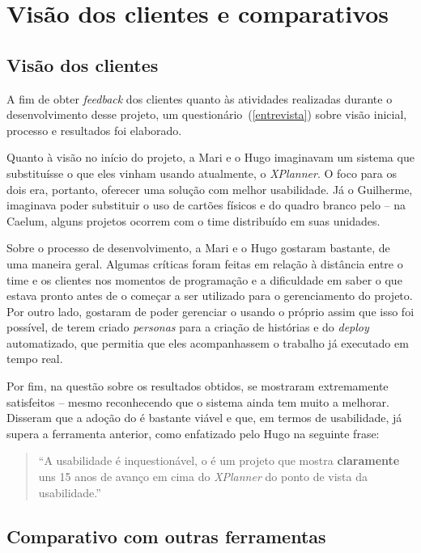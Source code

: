 \section{Visão dos clientes e comparativos}

\subsection{Visão dos clientes}

A fim de obter \textit{feedback} dos clientes quanto às atividades realizadas durante o desenvolvimento desse projeto,
um questionário~(\ref{entrevista}) sobre visão inicial, processo e resultados foi elaborado.

Quanto à visão no início do projeto, a Mari e o Hugo imaginavam um sistema que substituísse o que eles vinham usando atualmente, o \textit{XPlanner}. O foco para os dois era, portanto, oferecer uma solução com melhor usabilidade. Já o Guilherme, imaginava poder substituir o uso de cartões físicos e do quadro branco pelo \calopsita{} -- na Caelum, alguns projetos ocorrem com o time distribuído em suas unidades.

Sobre o processo de desenvolvimento, a Mari e o Hugo gostaram bastante, de uma maneira geral. Algumas críticas foram feitas em relação à distância entre o time e os clientes nos momentos de programação e a dificuldade em saber o que estava pronto antes de o \calopsita{} começar a ser utilizado para o gerenciamento do projeto. Por outro lado, gostaram de poder gerenciar o \calopsita{} usando o próprio \calopsita{} assim que isso foi possível, de terem criado \textit{personas} para a criação de histórias e do \textit{deploy} automatizado, que permitia que eles acompanhassem o trabalho já executado em tempo real. 

Por fim, na questão sobre os resultados obtidos, se mostraram extremamente satisfeitos -- mesmo reconhecendo que o sistema ainda tem muito a melhorar. Disseram que a adoção do \calopsita{} é bastante viável e que, em termos de usabilidade, já supera a ferramenta anterior, como enfatizado pelo Hugo na seguinte frase:

\begin{quote}
``A usabilidade é inquestionável, o \calopsita{} é um projeto que mostra \textbf{claramente} uns 15 anos de avanço em cima do \textit{XPlanner} do ponto de vista da usabilidade.''
\end{quote}

\subsection{Comparativo com outras ferramentas}

